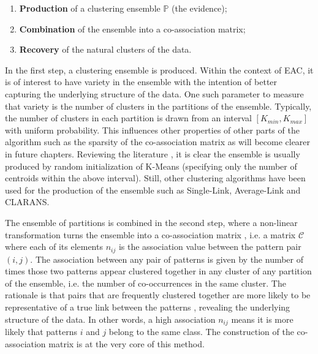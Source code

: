 \begin{enumerate}
\item \textbf{Production} of a clustering ensemble $\mathbb{P}$ (the evidence);
\item \textbf{Combination} of the ensemble into a co-association matrix;
\item \textbf{Recovery} of the natural clusters of the data.
\end{enumerate}

In the first step, a clustering ensemble is produced.
Within the context of EAC, it is of interest to have variety in the ensemble with the intention of better capturing the underlying structure of the data.
One such parameter to measure that variety is the number of clusters in the partitions of the ensemble.
Typically, the number of clusters in each partition is drawn from an interval $[K_{min}, K_{max}]$ with uniform probability.
This influences other properties of other parts of the algorithm such as the sparsity of the co-association matrix as will become clearer in future chapters.
Reviewing the literature \cite{Fred2002,Fred2005,Lourenco2007,lourenco2014ecg}, it is clear the ensemble is usually produced by random initialization of K-Means (specifying only the number of centroids within the above interval).
Still, other clustering algorithms have been used for the production of the ensemble \cite{Duarte2005} such as Single-Link, Average-Link and CLARANS.

The ensemble of partitions is combined in the second step, where a non-linear transformation turns the ensemble into a co-association matrix \cite{Fred2005}, i.e. a matrix $\mathcal{C}$ where each of its elements $n_{ij}$ is the association value between the pattern pair $(i,j)$.
The association between any pair of patterns is given by the number of times those two patterns appear clustered together in any cluster of any partition of the ensemble, i.e. the number of co-occurrences in the same cluster.
The rationale is that pairs that are frequently clustered together are more likely to be representative of a true link between the patterns \cite{Fred2002}, revealing the underlying structure of the data.
In other words, a high association $n_{ij}$ means it is more likely that patterns $i$ and $j$ belong to the same class.
The construction of the co-association matrix is at the very core of this method.

